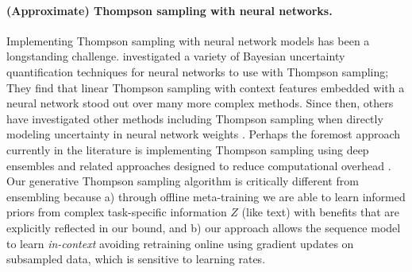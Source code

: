 \paragraph{(Approximate) Thompson sampling with neural networks.}
Implementing Thompson sampling with neural network models has been a longstanding challenge. \citet{riquelme2018deep} investigated a variety of Bayesian uncertainty quantification techniques for neural networks to use with Thompson sampling; They find that linear Thompson sampling with context features embedded with a neural network stood out over many more complex methods. Since then, others have investigated other methods including Thompson sampling when directly modeling uncertainty in neural network weights \citep{zhang2020neural,local-uncertainty}. Perhaps the foremost approach currently in the literature is implementing Thompson sampling using deep ensembles and related approaches designed to reduce computational overhead \citep{ensembleSampling,lu2017ensemble,dwaracherla2020hypermodels,osband2023approximate,osband2015bootstrapped,osband2023approximate,li2024ensemble++,li2024hyperagent}. Our generative Thompson sampling algorithm is critically different from ensembling because a) through offline meta-training we are able to learn informed priors from complex task-specific information $Z$ (like text) with benefits that are explicitly reflected in our bound, and b) our approach allows the sequence model to learn \textit{in-context} avoiding retraining online using gradient updates on subsampled data, which is sensitive to learning rates.
